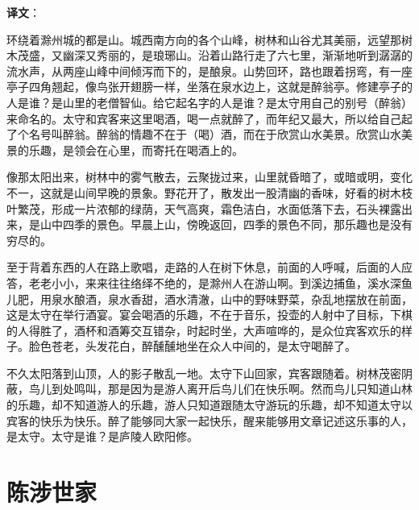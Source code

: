 \documentclass[12pt,UTF-8,openany,a4]{ctexbook}
\begin{document}
\newpage

\begin{Large}
   \noindent \textbf{译文}：
\end{Large}

\vspace{1em}

\begin{large}\yiwen
    
    环绕着滁州城的都是山。城西南方向的各个山峰，树林和山谷尤其美丽，远望那树木茂盛，又幽深又秀丽的，是琅琊山。沿着山路行走了六七里，渐渐地听到潺潺的流水声，从两座山峰中间倾泻而下的，是酿泉。山势回环，路也跟着拐弯，有一座亭子四角翘起，像鸟张开翅膀一样，坐落在泉水边上，这就是醉翁亭。修建亭子的人是谁？是山里的老僧智仙。给它起名字的人是谁？是太守用自己的别号（醉翁）来命名的。太守和宾客来这里喝酒，喝一点就醉了，而年纪又最大，所以给自己起了个名号叫醉翁。醉翁的情趣不在于（喝）酒，而在于欣赏山水美景。欣赏山水美景的乐趣，是领会在心里，而寄托在喝酒上的。
    
    像那太阳出来，树林中的雾气散去，云聚拢过来，山里就昏暗了，或暗或明，变化不一，这就是山间早晚的景象。野花开了，散发出一股清幽的香味，好看的树木枝叶繁茂，形成一片浓郁的绿荫，天气高爽，霜色洁白，水面低落下去，石头裸露出来，是山中四季的景色。早晨上山，傍晚返回，四季的景色不同，那乐趣也是没有穷尽的。
    
    至于背着东西的人在路上歌唱，走路的人在树下休息，前面的人呼喊，后面的人应答，老老小小，来来往往络绎不绝的，是滁州人在游山啊。到溪边捕鱼，溪水深鱼儿肥，用泉水酿酒，泉水香甜，酒水清澈，山中的野味野菜，杂乱地摆放在前面，这是太守在举行酒宴。宴会喝酒的乐趣，不在于音乐，投壶的人射中了目标，下棋的人得胜了，酒杯和酒筹交互错杂，时起时坐，大声喧哗的，是众位宾客欢乐的样子。脸色苍老，头发花白，醉醺醺地坐在众人中间的，是太守喝醉了。
    
    不久太阳落到山顶，人的影子散乱一地。太守下山回家，宾客跟随着。树林茂密阴蔽，鸟儿到处鸣叫，那是因为是游人离开后鸟儿们在快乐啊。然而鸟儿只知道山林的乐趣，却不知道游人的乐趣，游人只知道跟随太守游玩的乐趣，却不知道太守以宾客的快乐为快乐。醉了能够同大家一起快乐，醒来能够用文章记述这乐事的人，是太守。太守是谁？是庐陵人欧阳修。
    

\end{large}



\chapter{陈涉世家}
\end{document}
